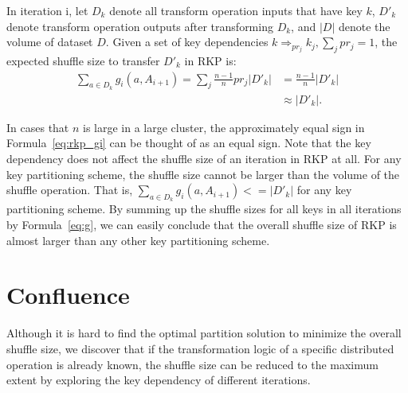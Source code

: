 \documentclass[10pt,journal,compsoc]{IEEEtran}
\begin{document}
In iteration i, let $D_{k}$ denote all transform operation inputs that have key $k$, $D'_{k}$
denote transform operation outputs after transforming $D_{k}$, 
and $|D|$ denote the volume of dataset $D$. 
Given a set of key dependencies $k \Rightarrow_{pr_j} k_j, \sum_j pr_j = 1$, 
the expected shuffle size to transfer $D'_k$ in RKP is:
\begin{equation}\label{eq:rkp_gi}
\begin{aligned}
\sum_{a \in D_k} g_i(a, A_{i+1}) = \sum_j \frac{n-1}{n} pr_j  |D'_{k}| 
&= \frac{n-1}{n} |D'_{k}|\\
&\approx |D'_{k}|.
\end{aligned}
\end{equation}

In cases that $n$ is large in a large cluster, the approximately equal sign
in Formula~\ref{eq:rkp_gi} can be thought of as an equal sign. 
Note that the key dependency does not affect the shuffle size of an iteration in RKP at all. 
For any key partitioning scheme, the shuffle size cannot be larger than 
the volume of the shuffle operation. 
That is, $\sum_{a \in D_k} g_i(a, A_{i+1}) <= |D'_k|$ for any key partitioning scheme.
By summing up the shuffle sizes for all keys in all iterations by Formula~\ref{eq:g},
we can easily conclude that
the overall shuffle size of RKP is almost larger than any other key partitioning scheme. 


\section{Confluence}\label{section:confluence}
Although it is hard to find the optimal partition solution to minimize the overall shuffle size,
we discover that 
if the transformation logic of a specific distributed operation is already known, 
the shuffle size can be reduced to the maximum extent %
by exploring the key dependency of different iterations. 
\end{document}
